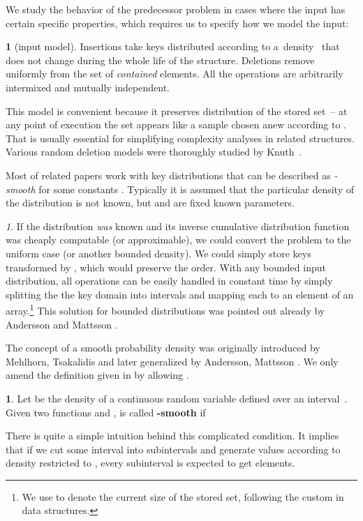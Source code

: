 \documentclass[
submission
, nomarks
]{dmtcs-episciences}
\theoremstyle{plain}
\theoremstyle{definition}
\newtheorem{defn}[thm]{\protect\definitionname}
\theoremstyle{remark}
\newtheorem*{rem*}{\protect\remarkname}
\theoremstyle{plain}
\theoremstyle{plain}
\providecommand{\definitionname}{Definition}
\providecommand{\remarkname}{Remark}
\def\emphDef#1{{\bf#1}}
\begin{document}
We study the behavior of the predecessor problem in cases where the input
has certain specific properties, which requires us to specify how we model the input:
\begin{defn}[input model]
Insertions take keys distributed according to a~density~ that
does not change during the whole life of the structure. Deletions
remove uniformly from the set of \emph{contained} elements. All the
operations are arbitrarily intermixed and mutually independent.
\end{defn}
This model is convenient because it preserves distribution of the
stored set~– at any point of execution the set appears like a sample
chosen anew according to . That is usually essential for simplifying complexity
analyses in related structures. Various random deletion models were
thoroughly studied by Knuth~\cite{Knuth77}.

Most of related papers work with key distributions that can be described
as \emph{-smooth} for some
constants . Typically it is assumed that the particular
density of the distribution is not known, but  and 
are fixed known parameters.
\begin{rem*}
If the distribution \emph{was} known and its inverse cumulative distribution
function  was cheaply computable (or approximable), we could
convert the problem to the uniform case (or another bounded density).
We could simply store keys transformed by , which would preserve
the order. With any bounded input distribution, all operations can
be easily handled in constant time by simply splitting the the key
domain into  intervals and mapping each to an element
of an array.\footnote{We use  to denote the current size of the stored set, following
the custom in data structures.} This solution for bounded distributions was pointed out already by
Andersson and Mattsson \cite[sec. 5.2]{AndersM93}.
\end{rem*}
The concept of a smooth probability density was originally introduced by Mehlhorn, Tsakalidis \cite{MehlT93} and later generalized by Andersson, Mattsson \cite{AndersM93}. We only amend the definition given in \cite{AndersM93,KMSTTZ06} by allowing .\begin{defn}\label{def:smooth}
	Let  be the density of a continuous random variable  defined over an interval~. Given two functions  and ,  is called \emphDef{-smooth} if
	
\end{defn}

There is quite a simple intuition behind this complicated condition. It implies that if we cut some interval  into  subintervals and generate  values according to density  restricted to , every subinterval is expected to get  elements.
\end{document}
